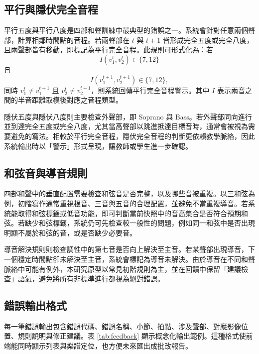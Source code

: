 \documentclass[12pt,a4paper]{article}
\begin{document}
\subsection{平行與隱伏完全音程}

平行五度與平行八度是四部和聲訓練中最典型的錯誤之一。系統會針對任意兩個聲部，計算相鄰時間點的音程。若兩聲部在 $t$ 與 $t+1$ 皆形成完全五度或完全八度，且兩聲部皆有移動，即標記為平行完全音程。此規則可形式化為：若
\[
  I(v_1^t,v_2^t) \in \{7, 12\}
\]
且
\[
  I(v_1^{t+1},v_2^{t+1}) \in \{7, 12\},
\]
同時 $v_1^t \neq v_1^{t+1}$ 且 $v_2^t \neq v_2^{t+1}$，則系統回傳平行完全音程警示。其中 $I$ 表示兩音之間的半音距離取模後對應之音程類型。

隱伏五度與隱伏八度則主要檢查外聲部，即 Soprano 與 Bass。若外聲部同向進行並到達完全五度或完全八度，尤其當高聲部以跳進抵達目標音時，通常會被視為需要避免的寫法。相較於平行完全音程，隱伏完全音程的判斷更依賴教學脈絡，因此系統輸出時以「警示」形式呈現，讓教師或學生進一步確認。

\subsection{和弦音與導音規則}

四部和聲中的垂直配置需要檢查和弦音是否完整，以及哪些音被重複。以三和弦為例，初階寫作通常重視根音、三音與五音的合理配置，並避免不當重複導音。若系統能取得和弦標籤或低音功能，即可判斷當前快照中的音高集合是否符合預期和弦。若缺少和弦標籤，系統仍可先檢查較一般性的問題，例如同一和弦中是否出現明顯不屬於和弦的音，或是否缺少必要音。

導音解決規則則檢查調性中的第七音是否向上解決至主音。若某聲部出現導音，下一個穩定時間點卻未解決至主音，系統會標記為導音未解決。由於導音在不同和聲脈絡中可能有例外，本研究原型以常見初階規則為主，並在回饋中保留「建議檢查」語氣，避免將所有非標準進行都視為絕對錯誤。

\subsection{錯誤輸出格式}

每一筆錯誤輸出包含錯誤代碼、錯誤名稱、小節、拍點、涉及聲部、對應影像位置、規則說明與修正建議。表 \ref{tab:feedback} 顯示概念化輸出範例。這種格式使前端能同時顯示列表與樂譜定位，也方便未來匯出成批改報告。
\end{document}
